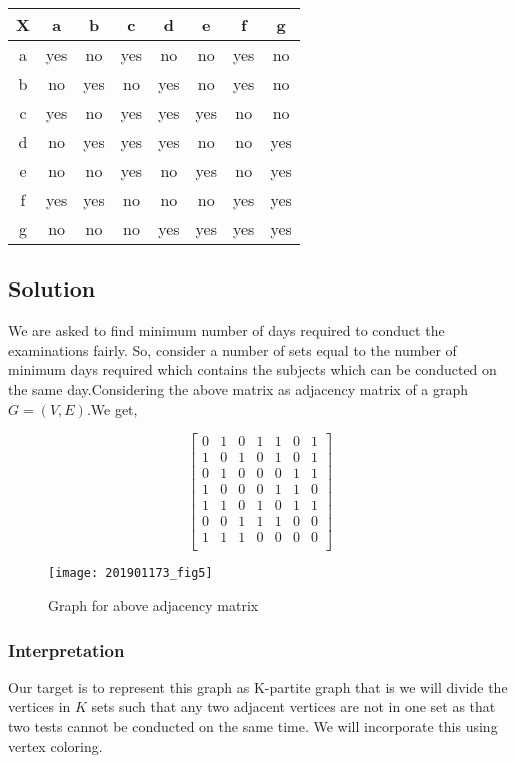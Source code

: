 \documentclass{article}
\begin{document}
\begin{center}
\begin{tabular}{ |c| c| c| c| c| c| c| c|}
\hline
X & a & b & c & d & e & f & g\\
\hline
a & yes & no & yes & no & no & yes & no\\
b & no & yes & no & yes & no & yes & no\\
c & yes & no & yes & yes & yes & no & no\\
d & no & yes & yes & yes & no & no & yes\\
e & no & no & yes & no & yes & no & yes\\
f & yes & yes & no & no & no & yes & yes\\
g & no & no & no & yes & yes & yes & yes\\
\hline
\end{tabular}
\end{center}

\subsection{Solution}
We are asked to find minimum number of days required to conduct the examinations fairly. So, consider a number of sets equal to the number of minimum days required which contains the subjects which can be conducted on the same day.Considering the above matrix as adjacency matrix of a graph $G = (V,E)$.We get,

\[
\begin{bmatrix}
0 & 1 & 0 & 1 & 1 & 0 & 1\\
1 & 0 & 1 & 0 & 1 & 0 & 1\\
0 & 1 & 0 & 0 & 0 & 1 & 1\\
1 & 0 & 0 & 0 & 1 & 1 & 0\\
1 & 1 & 0 & 1 & 0 & 1 & 1\\
0 & 0 & 1 & 1 & 1 & 0 & 0\\
1 & 1 & 1 & 0 & 0 & 0 & 0\\
\end{bmatrix}\]

\begin{figure}[h]
    \texttt{[image: 201901173\_fig5]}
    \caption{Graph for above adjacency matrix}
    \label{fig:201901173_fig5}
\end{figure}

\subsubsection{Interpretation}
Our target is to represent this graph as K-partite graph that is we will divide the vertices in $K$ sets such that any two adjacent vertices are not in one set as that two tests cannot be conducted on the same time. We will incorporate this using vertex coloring.
\end{document}
